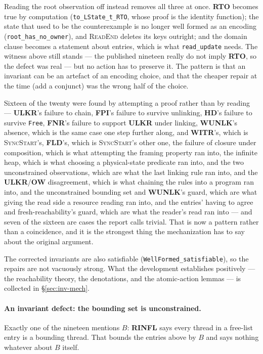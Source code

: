 Reading the root observation off \rt{} instead removes all three at once.
\textbf{RTO} becomes true by computation (\texttt{to\_LState\_t\_RTO}, whose
proof is the identity function); the state that used to be the counterexample is
no longer well formed as an encoding (\texttt{root\_has\_no\_owner}), and
\textsc{ReadEnd} deletes its keys outright; and the domain clause becomes a
statement about entries, which is what \texttt{read\_update} needs.  The witness
above still stands --- the published nineteen really do not imply \textbf{RTO},
so the defect was real --- but no action has to preserve it.  The pattern is
that an invariant can be an artefact of an encoding choice, and that the cheaper
repair at the time (add a conjunct) was the wrong half of the choice.

Sixteen of the twenty were found by attempting a proof rather than by reading ---
\textbf{ULKR}'s failure to chain, \textbf{FPI}'s failure to survive unlinking,
\textbf{HD}'s failure to survive \texttt{Free}, \textbf{FNR}'s failure to
support \textbf{ULKR} under linking, \textbf{WUNLK}'s absence, which is the same case
one step further along, and \textbf{WITR}'s, which is \textsc{SyncStart}'s, \textbf{FLD}'s, which is
\textsc{SyncStart}'s other one, the failure of closure under composition, which
is what attempting the framing property ran into, the infinite heap, which is
what choosing a physical-state predicate ran into, and the two unconstrained
observations, which are what the last linking rule ran into, and the
\textbf{ULKR}/\textbf{OW} disagreement, which is what chaining the rules into a
program ran into, and the unconstrained bounding set and \textbf{WUNLK}'s guard,
which are what giving the read side a resource reading ran into, and the
entries' having to agree and fresh-reachability's guard, which are what the
reader's read ran into --- and seven of the sixteen are cases the report calls
trivial.  That is now a pattern rather than a coincidence, and it is the
strongest thing the mechanization has to say about the original argument.

The corrected invariants are also satisfiable
(\texttt{WellFormed\_satisfiable}), so the repairs are not vacuously strong.
What the development establishes positively --- the reachability theory, the
denotations, and the atomic-action lemmas --- is collected in
\S\ref{sec:inv-mech}.

\paragraph{An invariant defect: the bounding set is unconstrained.}
\label{sec:defect-br}
Exactly one of the nineteen mentions $B$: \textbf{RINFL} says every thread in a
free-list entry is a bounding thread.  That bounds the entries above by $B$ and
says nothing whatever about $B$ itself.

